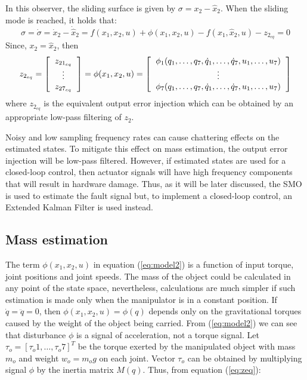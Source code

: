 \documentclass[a4paper, 10pt]{article}
\begin{document}
In this observer, the sliding surface is given by $\sigma = x_2 - \hat{x}_2$. When the sliding mode is reached, it holds that:
\[\sigma = \dot{\sigma} = \dot{x}_2 - \dot{\hat{x}}_2 = f(x_1, x_2, u) + \phi(x_1, x_2, u) - f(x_1, \hat{x}_2, u) - z_{2_{eq}} = 0\]
Since,  $x_2 = \hat{x}_2$, then
\begin{equation}
  z_{2_{eq}} = \left[\begin{tabular}{c}
      $z_{21_{eq}}$\\
      $\vdots$\\
      $z_{27_{eq}}$
    \end{tabular}\right] = \phi(x_1, x_2, u) =
  \left[\begin{tabular}{c}
      $\phi_1(q_1,\dots, q_7, \dot{q}_1, \dots, \dot{q}_7, u_1, \dots,u_7)$\\
      $\vdots$\\
      $\phi_7(q_1,\dots, q_7, \dot{q}_1, \dots, \dot{q}_7, u_1, \dots,u_7)$
    \end{tabular}\right]
  \label{eq:zeq}
\end{equation}
where $z_{2_{eq}}$ is the equivalent output error injection which can be obtained by an appropriate low-pass filtering of $z_2$.

Noisy and low sampling frequency rates can cause chattering effects on the estimated states. To mitigate this effect on mass estimation, the output error injection will be low-pass filtered. However, if estimated states are used for a closed-loop control, then actuator signals will have high frequency components that will result in hardware damage. Thus, as it will be later discussed, the SMO is used to estimate the fault signal but, to implement a closed-loop control, an Extended Kalman Filter is used instead. 

\subsection{Mass estimation}
\label{sec:MassEstimation}
The term $\phi(x_1, x_2, u)$ in equation (\ref{eq:model2}) is a function of input torque, joint positions and joint speeds. The mass of the object could be calculated in any point of the state space, nevertheless, calculations are much simpler if such estimation is made only when the manipulator is in a constant position. If $\dot{q}= \ddot{q} = 0$, then $\phi(x_1, x_2, u) = \phi(q)$ depends only on the gravitational torques caused by the weight of the object being carried. From (\ref{eq:model2}) we can see that disturbance $\phi$ is a signal of acceleration, not a torque signal. Let $\tau_o = [\tau_o1,\dots,\tau_o7]^T$ be the torque exerted by the manipulated object with mass $m_o$ and weight $w_o=m_o g$ on each joint. Vector $\tau_o$ can be obtained by multiplying signal $\phi$ by the inertia matrix $M(q)$. Thus, from equation (\ref{eq:zeq}):
\end{document}
